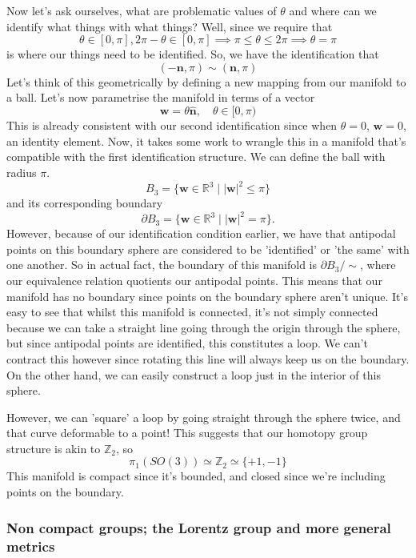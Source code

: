 Now let's ask ourselves, what are problematic values of $\theta$ and where can we identify what things with what things? Well, since we require that 
\[ 
	\theta \in [0,\pi ], 2 \pi  -\theta \in [ 0, \pi ] \implies \pi \leq \theta \leq 2 \pi \implies \theta = \pi 
\] is where our things need to be identified. So, we have the identification that 
\[ 
	( - \mathbf{n}, \pi) \sim (\mathbf{n}, \pi )
\]  
Let's think of this geometrically by defining a new mapping from our manifold to a ball. Let's now parametrise the manifold in terms of a vector 
\[ 
 	\mathbf{w} = \theta \hat{ \mathbf{ n} }, \quad \theta \in [0, \pi ) 
\] This is already consistent with our second identification since when  $\theta = 0$, $\mathbf{ w}  = 0 $, an identity element. Now, it takes some work to wrangle this in a manifold that's compatible with the first identification structure. 
We can define the ball with radius $ \pi$. 
\[
	B_3  = \{\mathbf{w} \in \mathbb{R}^3 \mid |\mathbf{w}|^2 \leq \pi  \} 
\]
and its corresponding boundary 
\[
	\partial B_3 = \{\mathbf{w} \in \mathbb{R}^3 \mid |\mathbf{w}|^2 =\pi  \}. 
\] However, because of our identification condition earlier, we have that antipodal points on this boundary sphere are considered to be 'identified' or 'the same' with one another. So in actual fact, the boundary of this manifold is $\partial B_3  / \sim$, where our equivalence relation quotients our antipodal points. This means that our manifold has no boundary since points on the boundary sphere aren't unique. It's easy to see that whilst this manifold is connected, it's not simply connected because we can take a straight line going through the origin through the sphere, but since antipodal points are identified, this constitutes a loop. We can't contract this however since rotating this line will always keep us on the boundary. On the other hand, we can easily construct a loop just in the interior of this sphere. 

However, we can 'square' a loop by going straight through the sphere twice, and that curve  deformable to a point! This suggests that our homotopy group structure is akin to $\mathbb{Z}_2$, so 
\[ 
	\pi_1 ( SO ( 3) ) \simeq \mathbb{Z}_ 2 \simeq \{ +1, - 1 \} 
\] 
This manifold is compact since it's bounded, and closed since we're including points on the boundary. 

\pagebreak 
\subsubsection{Non compact groups; the Lorentz group and more general metrics}

